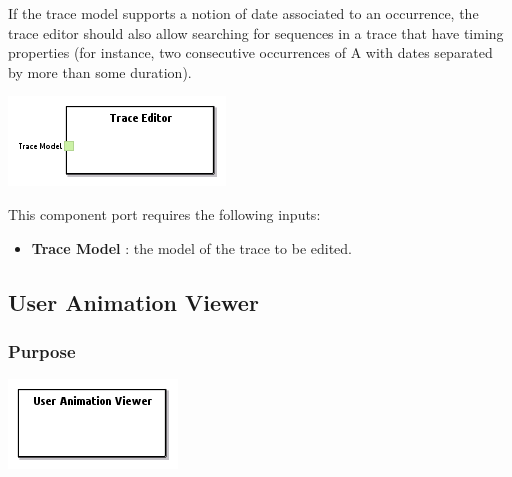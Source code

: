 \documentclass{gemoc} %
\begin{document}
If the trace model supports a notion of date associated to an occurrence, the trace editor should also allow searching for sequences in a trace that have timing properties (for instance, two consecutive occurrences of A with dates separated by more than some duration).

\begin{center}
\includegraphics*[trim=0.0cm 0.0cm 0cm 0.0cm, clip=true]{../images/generated/Generated_Trace_Editor.png}
\end{center}

This component port requires the following inputs:
\begin{itemize}
  \item \textbf{Trace Model} :
the model of the trace to be edited.
\end{itemize}



\subsection{User Animation Viewer}


\subsubsection{Purpose}


\begin{center}
\includegraphics*[trim=0.0cm 0.0cm 0cm 0.0cm, clip=true]{../images/generated/Generated_User_Animation_Viewer.png}
\end{center}
\end{document}
